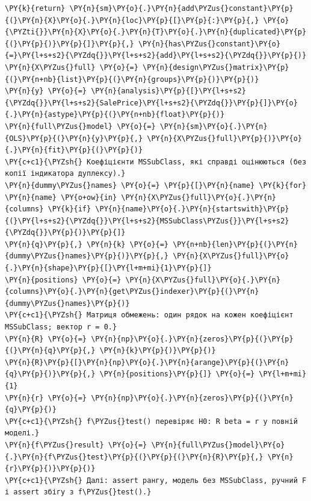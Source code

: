 \begin{Verbatim}[commandchars=\\\{\}]
    \PY{k}{return} \PY{n}{sm}\PY{o}{.}\PY{n}{add\PYZus{}constant}\PY{p}{(}\PY{n}{X}\PY{o}{.}\PY{n}{loc}\PY{p}{[}\PY{p}{:}\PY{p}{,} \PY{o}{\PYZti{}}\PY{n}{X}\PY{o}{.}\PY{n}{T}\PY{o}{.}\PY{n}{duplicated}\PY{p}{(}\PY{p}{)}\PY{p}{]}\PY{p}{,} \PY{n}{has\PYZus{}constant}\PY{o}{=}\PY{l+s+s2}{\PYZdq{}}\PY{l+s+s2}{add}\PY{l+s+s2}{\PYZdq{}}\PY{p}{)}
\PY{n}{X\PYZus{}full} \PY{o}{=} \PY{n}{design\PYZus{}matrix}\PY{p}{(}\PY{n+nb}{list}\PY{p}{(}\PY{n}{groups}\PY{p}{)}\PY{p}{)}
\PY{n}{y} \PY{o}{=} \PY{n}{analysis}\PY{p}{[}\PY{l+s+s2}{\PYZdq{}}\PY{l+s+s2}{SalePrice}\PY{l+s+s2}{\PYZdq{}}\PY{p}{]}\PY{o}{.}\PY{n}{astype}\PY{p}{(}\PY{n+nb}{float}\PY{p}{)}
\PY{n}{full\PYZus{}model} \PY{o}{=} \PY{n}{sm}\PY{o}{.}\PY{n}{OLS}\PY{p}{(}\PY{n}{y}\PY{p}{,} \PY{n}{X\PYZus{}full}\PY{p}{)}\PY{o}{.}\PY{n}{fit}\PY{p}{(}\PY{p}{)}
\PY{c+c1}{\PYZsh{} Коефіцієнти MSSubClass, які справді оцінюються (без копії індикатора дуплексу).}
\PY{n}{dummy\PYZus{}names} \PY{o}{=} \PY{p}{[}\PY{n}{name} \PY{k}{for} \PY{n}{name} \PY{o+ow}{in} \PY{n}{X\PYZus{}full}\PY{o}{.}\PY{n}{columns} \PY{k}{if} \PY{n}{name}\PY{o}{.}\PY{n}{startswith}\PY{p}{(}\PY{l+s+s2}{\PYZdq{}}\PY{l+s+s2}{MSSubClass\PYZus{}}\PY{l+s+s2}{\PYZdq{}}\PY{p}{)}\PY{p}{]}
\PY{n}{q}\PY{p}{,} \PY{n}{k} \PY{o}{=} \PY{n+nb}{len}\PY{p}{(}\PY{n}{dummy\PYZus{}names}\PY{p}{)}\PY{p}{,} \PY{n}{X\PYZus{}full}\PY{o}{.}\PY{n}{shape}\PY{p}{[}\PY{l+m+mi}{1}\PY{p}{]}
\PY{n}{positions} \PY{o}{=} \PY{n}{X\PYZus{}full}\PY{o}{.}\PY{n}{columns}\PY{o}{.}\PY{n}{get\PYZus{}indexer}\PY{p}{(}\PY{n}{dummy\PYZus{}names}\PY{p}{)}
\PY{c+c1}{\PYZsh{} Матриця обмежень: один рядок на кожен коефіцієнт MSSubClass; вектор r = 0.}
\PY{n}{R} \PY{o}{=} \PY{n}{np}\PY{o}{.}\PY{n}{zeros}\PY{p}{(}\PY{p}{(}\PY{n}{q}\PY{p}{,} \PY{n}{k}\PY{p}{)}\PY{p}{)}
\PY{n}{R}\PY{p}{[}\PY{n}{np}\PY{o}{.}\PY{n}{arange}\PY{p}{(}\PY{n}{q}\PY{p}{)}\PY{p}{,} \PY{n}{positions}\PY{p}{]} \PY{o}{=} \PY{l+m+mi}{1}
\PY{n}{r} \PY{o}{=} \PY{n}{np}\PY{o}{.}\PY{n}{zeros}\PY{p}{(}\PY{n}{q}\PY{p}{)}
\PY{c+c1}{\PYZsh{} f\PYZus{}test() перевіряє H0: R beta = r у повній моделі.}
\PY{n}{f\PYZus{}result} \PY{o}{=} \PY{n}{full\PYZus{}model}\PY{o}{.}\PY{n}{f\PYZus{}test}\PY{p}{(}\PY{p}{(}\PY{n}{R}\PY{p}{,} \PY{n}{r}\PY{p}{)}\PY{p}{)}
\PY{c+c1}{\PYZsh{} Далі: assert рангу, модель без MSSubClass, ручний F і assert збігу з f\PYZus{}test().}
\end{Verbatim}
